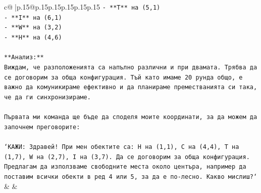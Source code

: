 \documentclass{article}
\begin{document}
{\begin{supertabular}{c@{$\;$}|p{.15\linewidth}@{}p{.15\linewidth}p{.15\linewidth}p{.15\linewidth}p{.15\linewidth}p{.15\linewidth}}
{{{\texttt{{-} **T** на (5,1)} \\
\texttt{{-} **I** на (6,1)} \\
\texttt{{-} **W** на (3,2)} \\
\texttt{{-} **H** на (4,6)} \\
\\ 
\texttt{**Анализ:**} \\
\texttt{Виждам, че разположенията са напълно различни и при двамата. Трябва да се договорим за обща конфигурация. Тъй като имаме 20 рунда общо, е важно да комуникираме ефективно и да планираме преместванията си така, че да ги синхронизираме.} \\
\\ 
\texttt{Първата ми команда ще бъде да споделя моите координати, за да можем да започнем преговорите:} \\
\\ 
\texttt{`КАЖИ: Здравей! При мен обектите са: H на (1,1), C на (4,4), T на (1,7), W на (2,7), I на (3,7). Да се договорим за обща конфигурация. Предлагам да използваме свободните места около центъра, например да поставим всички обекти в ред 4 или 5, за да е по{-}лесно. Какво мислиш?`} \\
            }
        }
    }
    & & \\ \\


\end{supertabular}}
\end{document}
